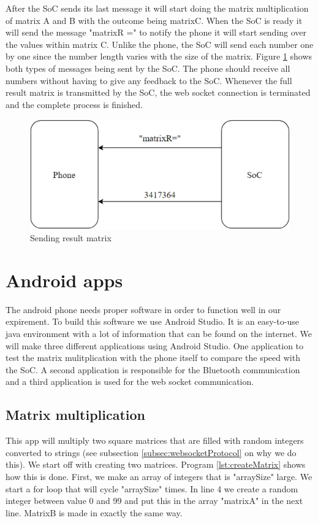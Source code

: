 \documentclass[a4paper, 11pt]{report}
\begin{document}
After the SoC sends its last message it will start doing the matrix multiplication of matrix A and B with the outcome being matrixC. When the SoC is ready it will send the message "matrixR =" to notify the phone it will start sending over the values within matrix C. Unlike the phone, the SoC will send each number one by one since the number length varies with the size of the matrix. Figure \ref{fig:ResultMatrix} shows both types of messages being sent by the SoC. The phone should receive all numbers without having to give any feedback to the SoC. Whenever the full result matrix is transmitted by the SoC, the web socket connection is terminated and the complete process is finished.

\begin{figure}[ht]
\centering
\includegraphics[scale=0.7]{images/webSocketCom2.pdf}
\caption{Sending result matrix}\label{fig:ResultMatrix}
\end{figure}

\section{Android apps}\label{sec:AndroidApps}
The android phone needs proper software in order to function well in our expirement. To build this software we use Android Studio. It is an easy-to-use java environment with a lot of information that can be found on the internet. We will make three different applications using Android Studio. One application to test the matrix mulitplication with the phone itself to compare the speed with the SoC. A second application is responsible for the Bluetooth communication and a third application is used for the web socket communication.

	\subsection{Matrix multiplication}
This app will multiply two square matrices that are filled with random integers converted to strings (see subsection \ref{subsec:websocketProtocol} on why we do this). We start off with creating two matrices. Program \ref{lst:createMatrix} shows how this is done. First, we make an array of integers that is "arraySize" large. We start a for loop that will cycle "arraySize" times. In line 4 we create a random integer between value 0 and 99 and put this in the array "matrixA" in the next line. MatrixB is made in exactly the same way.
\end{document}
